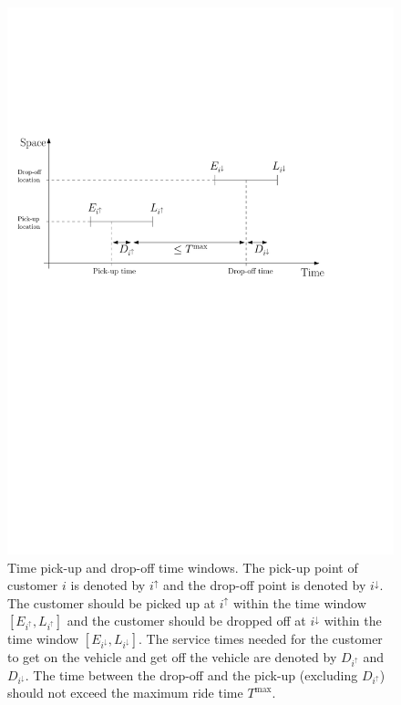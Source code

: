 \documentclass[dissertation,draft*]{aaltoseries}
\begin{document}
\begin{figure}[ht]
\begin{center}
\includegraphics[width=0.9 \columnwidth]{timeline01}
\caption{Time pick-up and drop-off time windows. The pick-up point of
customer $i$ is denoted by $i^{\uparrow}$ and the drop-off point is denoted by $i^{\downarrow}$.
The customer should be picked up at $i^{\uparrow}$ within the time window $[E_{i^{\uparrow}},L_{i^{\uparrow}}]$
and the customer should be dropped off at $i^{\downarrow}$ within the time window $[E_{i^{\downarrow}},L_{i^{\downarrow}}]$.
The service times needed for the customer to get on the vehicle
and get off the vehicle are denoted by $D_{i^{\uparrow}}$ and $D_{i^{\downarrow}}$. The time between
the drop-off and the pick-up (excluding $D_{i^{\uparrow}}$) should not exceed the maximum ride time $T^{\max}$.
}
\label{timeline01}
\end{center}
\end{figure}
\end{document}
